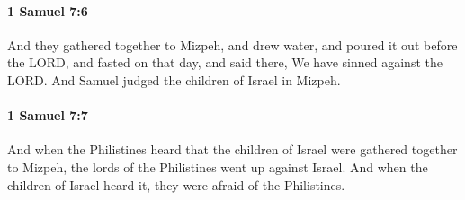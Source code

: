 		\paragraph{1 Samuel 7:6} %
			\label{1SAMUEL-7-6}

			And they gathered together to Mizpeh, and drew water, and poured it out before the LORD, and fasted on that day, and said there, We have sinned against the LORD. And Samuel judged the children of Israel in Mizpeh.


		\paragraph{1 Samuel 7:7} %
			\label{1SAMUEL-7-7}

			And when the Philistines heard that the children of Israel were gathered together to Mizpeh, the lords of the Philistines went up against Israel. And when the children of Israel heard it, they were afraid of the Philistines.

